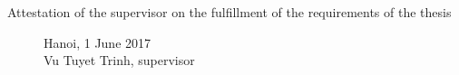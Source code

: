 \begin{description}
    \item[Attestation of the supervisor on the fulfillment of the requirements
        of the thesis] \hfill
        \begin{flushright}
            Hanoi, 1 June 2017\\
            \vspace{1.5cm}
            Vu Tuyet Trinh, supervisor
        \end{flushright}

\end{description}
